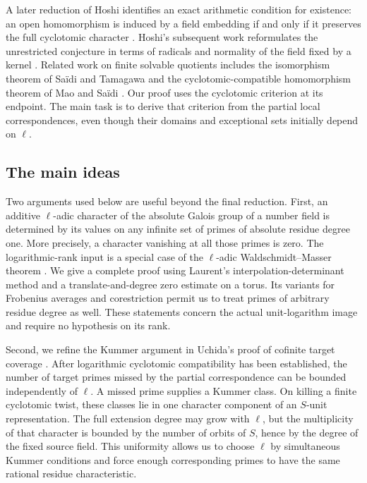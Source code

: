 A later reduction of Hoshi identifies an exact arithmetic condition for existence: an open homomorphism is induced by a field embedding if and only if it preserves the full cyclotomic character \cite[Theorem~3.4]{hoshi2025}. Hoshi's subsequent work reformulates the unrestricted conjecture in terms of radicals and normality of the field fixed by a kernel \cite[Theorem~B]{hoshi2026}. Related work on finite solvable quotients includes the isomorphism theorem of Sa\"idi and Tamagawa \cite{saiditamagawa2022} and the cyclotomic-compatible homomorphism theorem of Mao and Sa\"idi \cite{maosaidi2025}. Our proof uses the cyclotomic criterion at its endpoint. The main task is to derive that criterion from the partial local correspondences, even though their domains and exceptional sets initially depend on $\ell$.

\subsection{The main ideas}
Two arguments used below are useful beyond the final reduction. First, an additive $\ell$-adic character of the absolute Galois group of a number field is determined by its values on any infinite set of primes of absolute residue degree one. More precisely, a character vanishing at all those primes is zero. The logarithmic-rank input is a special case of the $\ell$-adic Waldschmidt--Masser theorem \cite{waldschmidt1981,masser1981,dasgupta2023}. We give a complete proof using Laurent's interpolation-determinant method \cite{laurent1991} and a translate-and-degree zero estimate on a torus. Its variants for Frobenius averages and corestriction permit us to treat primes of arbitrary residue degree as well. These statements concern the actual unit-logarithm image and require no hypothesis on its rank.

Second, we refine the Kummer argument in Uchida's proof of cofinite target coverage \cite[Proposition~1]{uchida1981}. After logarithmic cyclotomic compatibility has been established, the number of target primes missed by the partial correspondence can be bounded independently of $\ell$. A missed prime supplies a Kummer class. On killing a finite cyclotomic twist, these classes lie in one character component of an $S$-unit representation. The full extension degree may grow with $\ell$, but the multiplicity of that character is bounded by the number of orbits of $S$, hence by the degree of the fixed source field. This uniformity allows us to choose $\ell$ by simultaneous Kummer conditions and force enough corresponding primes to have the same rational residue characteristic.

